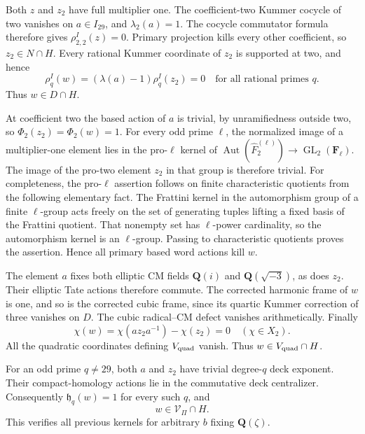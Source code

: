 Both \(z\) and \(z_2\) have full multiplier one. The
coefficient-two Kummer cocycle of two vanishes on \(a\in I_{29}\),
and \(\lambda_2(a)=1\). The cocycle commutator formula therefore
gives \(\rho_{2,2}^I(z)=0\). Primary projection kills every other
coefficient, so \(z_2\in N\cap H\). Every rational Kummer
coordinate of \(z_2\) is supported at two, and hence
\[
                 \rho_q^I(w)=(\lambda(a)-1)\rho_q^I(z_2)=0
                         \quad\text{for all rational primes }q.
\]
Thus \(w\in D\cap H\).

At coefficient two the based action of \(a\) is trivial, by
unramifiedness outside two, so \(\Phi_2(z_2)=\Phi_2(w)=1\).
For every odd prime \(\ell\), the normalized image of a
multiplier-one element lies in the pro-\(\ell\) kernel of
\(\operatorname{Aut}(\widehat F_2^{(\ell)})\to
\operatorname{GL}_2(\mathbf F_\ell)\). The image of the pro-two
element \(z_2\) in that group is therefore trivial.
For completeness, the pro-\(\ell\) assertion follows on finite
characteristic quotients from the following elementary fact. The
Frattini kernel in the automorphism group of a finite \(\ell\)-group
acts freely on the set of generating tuples lifting a fixed basis of
the Frattini quotient. That nonempty set has \(\ell\)-power cardinality,
so the automorphism kernel is an \(\ell\)-group. Passing to
characteristic quotients proves the assertion.
Hence all primary based word actions kill \(w\).

The element \(a\) fixes both elliptic CM fields
\(\mathbf Q(i)\) and \(\mathbf Q(\sqrt{-3})\), as does \(z_2\).
Their elliptic Tate actions therefore commute. The corrected harmonic
frame of \(w\) is one, and so is the corrected cubic frame, since
its quartic Kummer correction of three vanishes on \(D\).
The cubic radical--CM defect vanishes arithmetically. Finally
\[
                 \chi(w)=\chi(a z_2a^{-1})-\chi(z_2)=0
                              \quad(\chi\in X_2).
\]
All the quadratic coordinates defining \(V_{\rm quad}\) vanish.
Thus \(w\in V_{\rm quad}\cap H\).

For an odd prime \(q\ne29\), both \(a\) and \(z_2\) have
trivial degree-\(q\) deck exponent. Their compact-homology actions
lie in the commutative deck centralizer. Consequently
\(\mathfrak h_q(w)=1\) for every such \(q\), and
\begin{equation}\label{eq:g29-word-membership}
                               w\in\mathcal V_\Pi\cap H.
\end{equation}
This verifies all previous kernels for arbitrary \(b\) fixing
\(\mathbf Q(\zeta)\).

